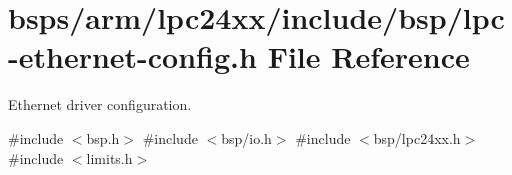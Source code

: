 \hypertarget{lpc24xx_2include_2bsp_2lpc-ethernet-config_8h}{}\section{bsps/arm/lpc24xx/include/bsp/lpc-\/ethernet-\/config.h File Reference}
\label{lpc24xx_2include_2bsp_2lpc-ethernet-config_8h}


Ethernet driver configuration.  


{\ttfamily \#include $<$bsp.\+h$>$}\newline
{\ttfamily \#include $<$bsp/io.\+h$>$}\newline
{\ttfamily \#include $<$bsp/lpc24xx.\+h$>$}\newline
{\ttfamily \#include $<$limits.\+h$>$}\newline
